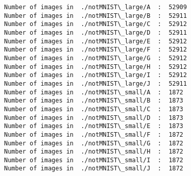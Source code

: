 \documentclass[11pt]{article}
\begin{document}
    \begin{Verbatim}[commandchars=\\\{\}]
Number of images in  ./notMNIST\_large/A  :  52909
Number of images in  ./notMNIST\_large/B  :  52911
Number of images in  ./notMNIST\_large/C  :  52912
Number of images in  ./notMNIST\_large/D  :  52911
Number of images in  ./notMNIST\_large/E  :  52912
Number of images in  ./notMNIST\_large/F  :  52912
Number of images in  ./notMNIST\_large/G  :  52912
Number of images in  ./notMNIST\_large/H  :  52912
Number of images in  ./notMNIST\_large/I  :  52912
Number of images in  ./notMNIST\_large/J  :  52911
Number of images in  ./notMNIST\_small/A  :  1872
Number of images in  ./notMNIST\_small/B  :  1873
Number of images in  ./notMNIST\_small/C  :  1873
Number of images in  ./notMNIST\_small/D  :  1873
Number of images in  ./notMNIST\_small/E  :  1873
Number of images in  ./notMNIST\_small/F  :  1872
Number of images in  ./notMNIST\_small/G  :  1872
Number of images in  ./notMNIST\_small/H  :  1872
Number of images in  ./notMNIST\_small/I  :  1872
Number of images in  ./notMNIST\_small/J  :  1872

    \end{Verbatim}
\end{document}
